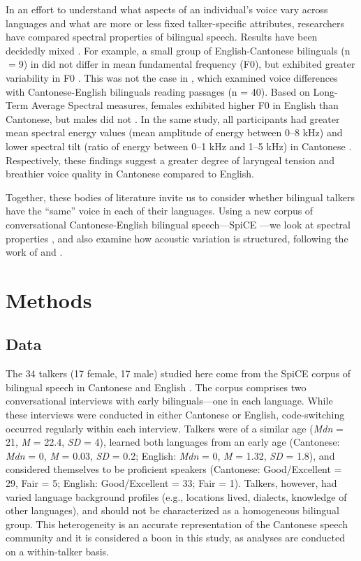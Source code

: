 In an effort to understand what aspects of an individual's voice vary across languages and what are more or less fixed talker-specific attributes, researchers have compared spectral properties of bilingual speech. Results have been decidedly mixed \citep{cheng_2020_f0,altenberg_2006_f0,ryabov_2016_self}. For example, a small group of English-Cantonese bilinguals (n$=$9) in did not differ in mean fundamental frequency (F0), but exhibited greater variability in F0 \citep{altenberg_2006_f0}. This was not the case in \citet{ng_2012_ltas}, which examined voice differences with Cantonese-English bilinguals reading passages (n = 40). Based on Long-Term Average Spectral measures, females exhibited higher F0 in English than Cantonese, but males did not \citep{ng_2012_ltas}. In the same study, all participants had greater mean spectral energy values (mean amplitude of energy between 0--8 kHz) and lower spectral tilt (ratio of energy between 0--1 kHz and 1--5 kHz) in Cantonese \citep{ng_2012_ltas}. Respectively, these findings suggest a greater degree of laryngeal tension and breathier voice quality in Cantonese compared to English.

Together, these bodies of literature invite us to consider whether bilingual talkers have the ``same'' voice in each of their languages. Using a new corpus of conversational Cantonese-English bilingual speech---SpiCE \citep{johnson_2020_spice}---we look at spectral properties \citep{cheng_2020_f0,altenberg_2006_f0, ryabov_2016_self,ng_2012_ltas}, and also examine how acoustic variation is structured, following the work of \citet{kreiman_2014_theory} and \citet{lee_2019_acoustic-paper}.

\section{Methods}\label{ch3:sec:methods}
\subsection{Data}\label{ch3:sec:data}
The 34 talkers (17 female, 17 male) studied here come from the SpiCE corpus of bilingual speech in Cantonese and English \citep{johnson_2020_spice}. The corpus comprises two conversational interviews with early bilinguals---one in each language. While these interviews were conducted in either Cantonese or English, code-switching occurred regularly within each interview. Talkers were of a similar age (\textit{Mdn} = 21, \textit{M} = 22.4, \textit{SD} = 4), learned both languages from an early age (Cantonese: \textit{Mdn} = 0, \textit{M} = 0.03, \textit{SD} = 0.2; English: \textit{Mdn} = 0, \textit{M} = 1.32, \textit{SD} = 1.8), and considered themselves to be proficient speakers (Cantonese: Good/Excellent = 29, Fair = 5; English: Good/Excellent = 33; Fair = 1). Talkers, however, had varied language background profiles (e.g., locations lived, dialects, knowledge of other languages), and should not be characterized as a homogeneous bilingual group. This heterogeneity is an accurate representation of the Cantonese speech community \citep{liang_2015_china} and it is considered a boon in this study, as analyses are conducted on a within-talker basis. 

